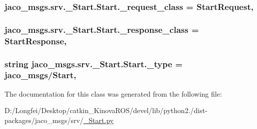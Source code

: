 \subsubsection[{\texorpdfstring{\+\_\+request\+\_\+class}{_request_class}}]{\setlength{\rightskip}{0pt plus 5cm}jaco\+\_\+msgs.\+srv.\+\_\+\+Start.\+Start.\+\_\+request\+\_\+class = {\bf Start\+Request}\hspace{0.3cm}{\ttfamily [static]}, {\ttfamily [private]}}\hypertarget{classjaco__msgs_1_1srv_1_1__Start_1_1Start_a402bb568aa7bdf40de49081a4fda2ba4}{}\label{classjaco__msgs_1_1srv_1_1__Start_1_1Start_a402bb568aa7bdf40de49081a4fda2ba4}
\subsubsection[{\texorpdfstring{\+\_\+response\+\_\+class}{_response_class}}]{\setlength{\rightskip}{0pt plus 5cm}jaco\+\_\+msgs.\+srv.\+\_\+\+Start.\+Start.\+\_\+response\+\_\+class = {\bf Start\+Response}\hspace{0.3cm}{\ttfamily [static]}, {\ttfamily [private]}}\hypertarget{classjaco__msgs_1_1srv_1_1__Start_1_1Start_a259aab253ab2228a411fed54d8e377dd}{}\label{classjaco__msgs_1_1srv_1_1__Start_1_1Start_a259aab253ab2228a411fed54d8e377dd}
\subsubsection[{\texorpdfstring{\+\_\+type}{_type}}]{\setlength{\rightskip}{0pt plus 5cm}string jaco\+\_\+msgs.\+srv.\+\_\+\+Start.\+Start.\+\_\+type = \textquotesingle{}jaco\+\_\+msgs/{\bf Start}\textquotesingle{}\hspace{0.3cm}{\ttfamily [static]}, {\ttfamily [private]}}\hypertarget{classjaco__msgs_1_1srv_1_1__Start_1_1Start_af94dab1726ee365380324d5ddb6bacc0}{}\label{classjaco__msgs_1_1srv_1_1__Start_1_1Start_af94dab1726ee365380324d5ddb6bacc0}


The documentation for this class was generated from the following file\+:\begin{DoxyCompactItemize}
\item 
D\+:/\+Longfei/\+Desktop/catkin\+\_\+\+Kinova\+R\+O\+S/devel/lib/python2./dist-\/packages/jaco\+\_\+msgs/srv/\hyperlink{__Start_8py}{\+\_\+\+Start.\+py}\end{DoxyCompactItemize}
